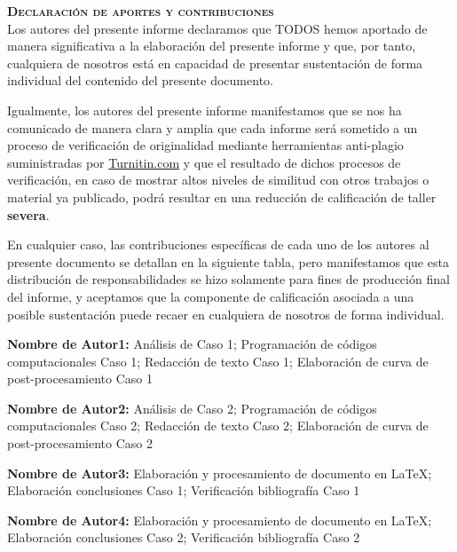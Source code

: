 \documentclass[11pt,stdletter,orderfromtodate,sigleft,twoside]{report}
\begin{document}

\thispagestyle{declarationstyle}
\vspace*{12mm}
\begin{framed}
    {\Large \textbf{\textsc{Declaración de aportes y contribuciones}}}\\[8mm]

Los autores del presente informe declaramos que TODOS hemos aportado de manera
significativa a la elaboración del presente informe y que, por tanto, cualquiera
de nosotros está en capacidad de presentar sustentación de forma individual del
contenido del presente documento.

Igualmente, los autores del presente informe manifestamos que se nos ha comunicado de
manera clara y amplia que cada informe será sometido a un proceso de verificación de
originalidad mediante herramientas anti-plagio suministradas por 
\href{https://www.turnitin.com/}{Turnitin.com} y que el resultado de dichos procesos de
verificaci\'on, en caso de mostrar altos niveles de similitud con otros trabajos o
material ya publicado, podr\'a resultar en una reducci\'on de calificaci\'on de taller
\textbf{severa}.

En cualquier caso, las contribuciones específicas de cada uno de los autores al
presente documento se detallan en la siguiente tabla, pero manifestamos que
esta distribución de responsabilidades se hizo solamente para fines de
producción final del informe, y aceptamos que la componente de calificación
asociada a una posible sustentación puede recaer en cualquiera de nosotros de
forma individual.

\end{framed}

\vfill

\begin{framed}
    {\large \textbf{Nombre de Autor1:} An\'alisis de Caso 1; Programaci\'on de c\'odigos computacionales Caso 1; Redacci\'on de texto Caso 1; Elaboraci\'on de curva de post-procesamiento Caso 1}\\[2mm]
\end{framed}
\begin{framed}
    {\large \textbf{Nombre de Autor2:} An\'alisis de Caso 2; Programaci\'on de c\'odigos computacionales Caso 2; Redacci\'on de texto Caso 2; Elaboraci\'on de curva de post-procesamiento Caso 2}\\[2mm]
\end{framed}
\begin{framed}
    {\large \textbf{Nombre de Autor3:} Elaboraci\'on y procesamiento de documento en \LaTeX ; Elaboraci\'on conclusiones Caso 1; Verificaci\'on bibliograf\'ia Caso 1}\\[2mm]
\end{framed}
\begin{framed}
    {\large \textbf{Nombre de Autor4:} Elaboraci\'on y procesamiento de documento en \LaTeX ; Elaboraci\'on conclusiones Caso 2; Verificaci\'on bibliograf\'ia Caso 2}\\[2mm]
\end{framed}
\end{document}
